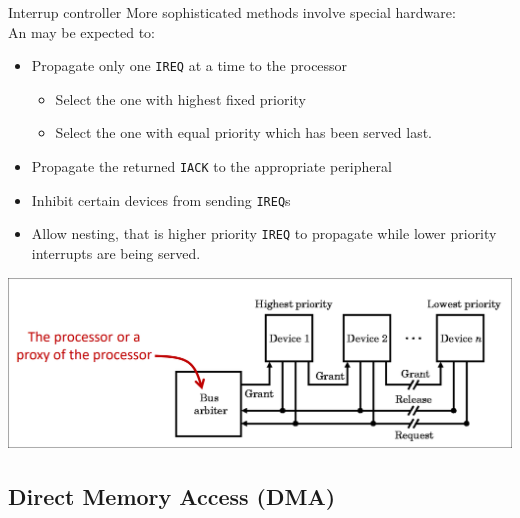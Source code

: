 \begin{parag}{Interrup controller}
	More sophisticated methods involve special hardware:\\
	An   may be expected to:
	\begin{itemize}
		\item Propagate only one \texttt{IREQ} at a time to the processor 
			\begin{itemize}
			    \item Select the one with highest fixed priority
			    \item Select the one with equal priority which has been served last.
			\end{itemize}
			\item Propagate the returned \texttt{IACK} to the appropriate peripheral
			\item Inhibit certain devices from sending \texttt{IREQ}s 
			\item Allow nesting, that is higher priority \texttt{IREQ} to propagate while lower priority interrupts are being served.
	\end{itemize}
	\begin{center}
	\includegraphics[scale=0.2]{screenshots/2025-10-22_15.png}
	\end{center}
\end{parag}

\subsection{Direct Memory Access (DMA)}

